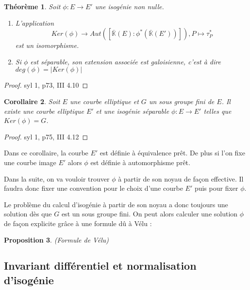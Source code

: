 \documentclass{article}
\newcommand{\K}[0]{\mathbb{K}}
\newcommand{\Kb}[0]{\bar{\K}}
\newtheorem{The}{Théorème}[section]
\newtheorem{Prop}[The]{Proposition}
\newtheorem{Coro}[The]{Corollaire}
\begin{document}
\begin{The}
	Soit $\phi : E\rightarrow E'$ une isogénie non nulle. 
	\begin{enumerate}
		\item L'application 
			\begin{equation*}
				Ker(\phi) \rightarrow Aut\left( \left[ \Kb(E) : \phi^{*}\left( \Kb(E')\right) \right] \right) , P\mapsto \tau_{P}^{*}
			\end{equation*} 
			est un isomorphisme.
		\item Si $\phi$ est séparable, son extension associée est galoisienne, c'est à dire $deg(\phi) = |Ker(\phi)|$
	\end{enumerate}
\end{The}

\begin{proof}
	
	syl 1, p73, III 4.10
	
\end{proof}

\begin{Coro}
	Soit $E$ une courbe elliptique et $G$ un sous groupe fini de $E$. Il existe une courbe elliptique $E'$ et une isogénie séparable $\phi : E \rightarrow E'$ telles que $Ker(\phi) = G$.
\end{Coro}

\begin{proof}
	
	syl 1, p75, III 4.12
	
\end{proof}


Dans ce corollaire, la courbe $E'$ est définie à équivalence prêt. De plus si l'on fixe une courbe image $E'$ alors $\phi$ est définie à automorphisme prêt. 

Dans la suite, on va vouloir trouver $\phi$ à partir de son noyau de façon effective. Il faudra donc fixer une convention pour le choix d'une courbe $E'$ puis pour fixer $\phi$.

Le problème du calcul d'isogénie à partir de son noyau a donc toujours une solution dès que $G$ est un sous groupe fini. On peut alors calculer une solution $\phi$ de façon explicite grâce à une formule dû à Vélu :

\begin{Prop}
	(Formule de Vélu)
	
	
\end{Prop}



\subsection{Invariant différentiel et normalisation d'isogénie}
\end{document}
